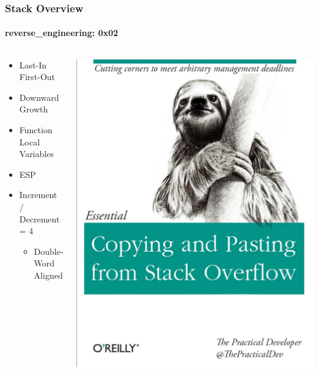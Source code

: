 \documentclass[aspectratio=169]{beamer}
\begin{document}
\begin{frame}
  \frametitle{Stack Overview}
  \framesubtitle{reverse\_engineering: 0x02}
  \begin{columns}
    \begin{column}{.40\textwidth}
      \begin{itemize}
      \item{Last-In First-Out}
      \item{Downward Growth}
      \item{Function Local Variables}
      \item{ESP}
      \item{Increment / Decrement = 4}
        \begin{itemize}
        \item{Double-Word Aligned}
        \end{itemize}
      \end{itemize}
    \end{column}
    \hfill
    \begin{column}{.60\textwidth}
      \begin{center}
        \includegraphics[scale=0.09]{stack-overflow-meme}
      \end{center}
    \end{column}
  \end{columns}
  \end{frame}
\end{document}
